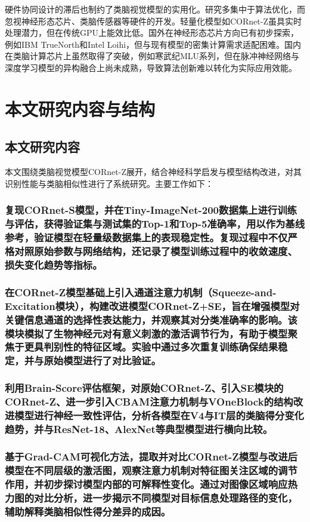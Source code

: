硬件协同设计的滞后也制约了类脑视觉模型的实用化。研究多集中于算法优化，而忽视神经形态芯片、类脑传感器等硬件的开发。轻量化模型如CORnet-Z虽具实时处理潜力，但在传统GPU上能效比低。国外在神经形态芯片方向已有初步探索，例如IBM TrueNorth和Intel Loihi，但与现有模型的密集计算需求适配困难。国内在类脑计算芯片上虽然取得了突破，例如寒武纪MLU系列，但在脉冲神经网络与深度学习模型的异构融合上尚未成熟，导致算法创新难以转化为实际应用效能。


\section{本文研究内容与结构}

\subsection{本文研究内容}

本文围绕类脑视觉模型CORnet-Z展开，结合神经科学启发与模型结构改进，对其识别性能与类脑相似性进行了系统研究。主要工作如下：

\subsubsection{复现CORnet-S模型，并在Tiny-ImageNet-200数据集上进行训练与评估，获得验证集与测试集的Top-1和Top-5准确率，用以作为基线参考，验证模型在轻量级数据集上的表现稳定性。复现过程中不仅严格对照原始参数与网络结构，还记录了模型训练过程中的收敛速度、损失变化趋势等指标。}

\subsubsection{在CORnet-Z模型基础上引入通道注意力机制（Squeeze-and-Excitation模块），构建改进模型CORnet-Z+SE，旨在增强模型对关键信息通道的选择性表达能力，并观察其对分类准确率的影响。该模块模拟了生物神经元对有意义刺激的激活调节行为，有助于模型聚焦于更具判别性的特征区域。实验中通过多次重复训练确保结果稳定，并与原始模型进行了对比验证。}

\subsubsection{利用Brain-Score评估框架，对原始CORnet-Z、引入SE模块的CORnet-Z、进一步引入CBAM注意力机制与VOneBlock的结构改进模型进行神经一致性评估，分析各模型在V4与IT层的类脑得分变化趋势，并与ResNet-18、AlexNet等典型模型进行横向比较。}

\subsubsection{基于Grad-CAM可视化方法，提取并对比CORnet-Z模型与改进后模型在不同层级的激活图，观察注意力机制对特征图关注区域的调节作用，并初步探讨模型内部的可解释性变化。通过对图像区域响应热力图的对比分析，进一步揭示不同模型对目标信息处理路径的变化，辅助解释类脑相似性得分差异的成因。}

